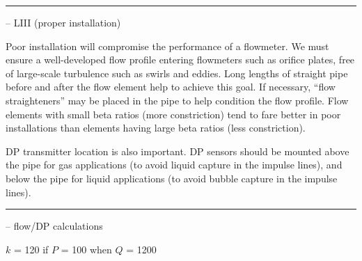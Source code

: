 \filbreak \vskip 5pt \hrule \vskip 5pt  -- LIII (proper installation) \vskip 10pt

Poor installation will compromise the performance of a flowmeter.  We must ensure a well-developed flow profile entering flowmeters such as orifice plates, free of large-scale turbulence such as swirls and eddies.  Long lengths of straight pipe before and after the flow element help to achieve this goal.  If necessary, ``flow straighteners'' may be placed in the pipe to help condition the flow profile.  Flow elements with small beta ratios (more constriction) tend to fare better in poor installations than elements having large beta ratios (less constriction).

\vskip 10pt

DP transmitter location is also important.  DP sensors should be mounted above the pipe for gas applications (to avoid liquid capture in the impulse lines), and below the pipe for liquid applications (to avoid bubble capture in the impulse lines).


\filbreak \vskip 5pt \hrule \vskip 5pt  -- flow/DP calculations \vskip 10pt

$k$ = 120 if $P$ = 100 when $Q$ = 1200

